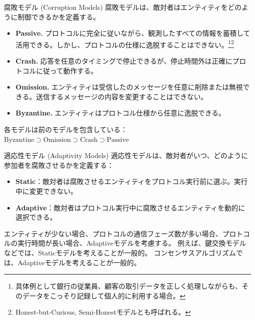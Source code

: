 \documentclass[aspectratio=169,10pt]{beamer}
\newenvironment{outlineblock}[1][]
{\begin{tcolorbox}[colframe=black, colback=white, boxrule=1pt, boxsep=5pt]}
{\end{tcolorbox}}
\begin{document}
\begin{frame}{腐敗モデル (Corruption Models)}
腐敗モデルは、敵対者はエンティティをどのように制御できるかを定義する。

\vspace{0.5em}

\begin{itemize}
    \item \textbf{Passive. }プロトコルに完全に従いながら、観測したすべての情報を蓄積して活用できる。しかし、プロトコルの仕様に逸脱することはできない。\footnote{具体例として銀行の従業員、顧客の取引データを正しく処理しながらも、そのデータをこっそり記録して個人的に利用する場合。}\footnote{Honest-but-Curious, Semi-Honestモデルとも呼ばれる。}
    
    \item \textbf{Crash. }応答を任意のタイミングで停止できるが、停止時間外は正確にプロトコルに従って動作する。
    
    \item \textbf{Omission. }エンティティは受信したのメッセージを任意に削除または無視できる。送信するメッセージの内容を変更することはできない。
    
    \item \textbf{Byzantine. }エンティティはプロトコル仕様から任意に逸脱できる。
\end{itemize}

\vspace{0.5em}

\begin{outlineblock}[]
各モデルは前のモデルを包含している：$\text{Byzantine} \supset \text{Omission} \supset \text{Crash} \supset \text{Passive}$
\end{outlineblock}

\end{frame}

\begin{frame}{適応性モデル (Adaptivity Models)}
適応性モデルは、敵対者がいつ、どのように参加者を腐敗させるかを定義する：

\vspace{0.5em}

\begin{itemize}
    \item \textbf{Static}：敵対者は腐敗させるエンティティをプロトコル実行前に選ぶ。実行中に変更できない。
    
    \item \textbf{Adaptive}：敵対者はプロトコル実行中に腐敗させるエンティティを動的に選択できる。
\end{itemize}

\vspace{0.5em}

\begin{outlineblock}[]
エンティティが少ない場合、プロトコルの通信フェーズ数が多い場合、プロトコルの実行時間が長い場合、Adaptiveモデルを考慮する。
例えば、鍵交換モデルなどでは、Staticモデルを考えることが一般的。
コンセンサスアルゴリズムでは、Adaptiveモデルを考えることが一般的。
\end{outlineblock}
\end{frame}
\end{document}
